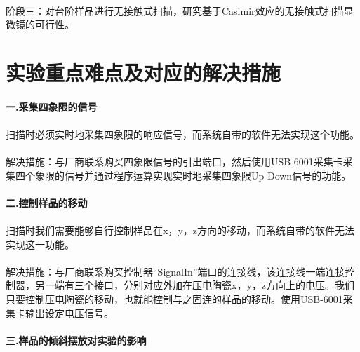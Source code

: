 \paragraph*{}阶段三：对台阶样品进行无接触式扫描，研究基于Casimir效应的无接触式扫描显微镜的可行性。



\section{实验重点难点及对应的解决措施}
\paragraph*{一.采集四象限的信号}
\paragraph*{}
扫描时必须实时地采集四象限的响应信号，而系统自带的软件无法实现这个功能。
\paragraph*{}
解决措施：与厂商联系购买四象限信号的引出端口，然后使用USB-6001采集卡采集四个象限的信号并通过程序运算实现实时地采集四象限Up-Down信号的功能。
\paragraph*{}
\paragraph*{二.控制样品的移动}
\paragraph*{}
扫描时我们需要能够自行控制样品在x，y，z方向的移动，而系统自带的软件无法实现这一功能。
\paragraph*{}
解决措施：与厂商联系购买控制器“SignalIn”端口的连接线，该连接线一端连接控制器，另一端有三个接口，分别对应外加在压电陶瓷x，y，z方向上的电压。我们只要控制压电陶瓷的移动，也就能控制与之固连的样品的移动。使用USB-6001采集卡输出设定电压信号。
\paragraph*{}
\paragraph*{三.样品的倾斜摆放对实验的影响}
